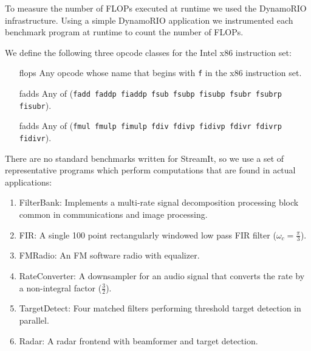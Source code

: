 To measure the number of FLOPs executed at runtime we used the DynamoRIO\cite{dynamo99}
infrastructure. Using a simple DynamoRIO application 
we instrumented each benchmark program at runtime to count the number of FLOPs.

We define the following three opcode classes for the Intel x86 instruction set:
\begin{itemize}
\item[flops] Any opcode whose name that begins with {\tt f} in the x86 instruction set.
\vspace{-6pt}
\item[fadds] Any of ({\tt fadd faddp fiaddp fsub fsubp fisubp fsubr fsubrp fisubr}).
\vspace{-6pt}
\item[fadds] Any of ({\tt fmul fmulp fimulp fdiv fdivp fidivp fdivr fdivrp fidivr}).
\vspace{-6pt}
\end{itemize}

There are no standard benchmarks written for StreamIt, so we use
a set of representative programs which perform computations that 
are found in actual applications: 

\begin{enumerate}
\item FilterBank: Implements a multi-rate signal decomposition processing block common in communications and image processing.
\vspace{-6pt}

\item FIR: A single 100 point rectangularly windowed low pass FIR filter ($\omega_c=\frac{\pi}{3}$).
\vspace{-6pt}

\item FMRadio: An FM software radio with equalizer.
\vspace{-6pt}

\item RateConverter: A downsampler for an audio signal that converts
the rate by a non-integral factor ($\frac{3}{2}$).
\vspace{-6pt}

\item TargetDetect: Four matched filters performing threshold target
detection in parallel.
\vspace{-6pt}

\item Radar: A radar frontend with beamformer and target detection.
\end{enumerate}

